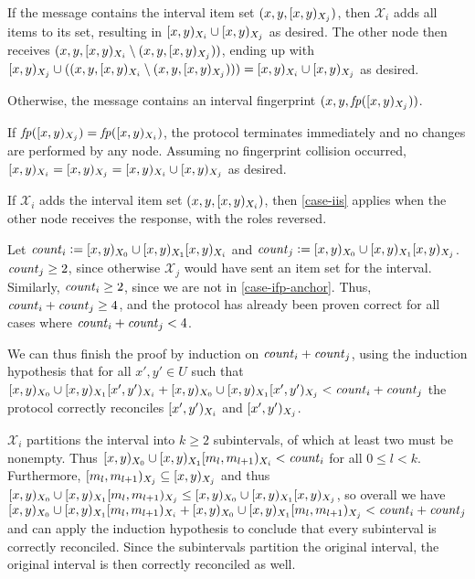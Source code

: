 \begin{caselist}
 \label{case-iis}  If the message contains the interval item set $({x}, {y}, [{x},{y})_{X_j})$, then $\mathcal{X}_i$ adds all items to its set, resulting in $[{x},{y})_{X_i} \cup [{x},{y})_{X_j}$ as desired. The other node then receives $({x}, {y}, {[{x},{y})_{X_i} \setminus ({x}, {y}, [{x},{y})_{X_j})})$, ending up with $[{x},{y})_{X_j} \cup (({x}, {y}, {[{x},{y})_{X_i} \setminus ({x}, {y}, [{x},{y})_{X_j})})) = [{x},{y})_{X_i} \cup [{x},{y})_{X_j}$ as desired.

 \label{case-ifp} Otherwise, the message contains an interval fingerprint $({x}, {y}, {\mathit{fp}([{x},{y})_{X_j})})$.

\begin{caselist}
 If $\mathit{fp}([{x},{y})_{X_j}) = \mathit{fp}([{x},{y})_{X_i})$, the protocol terminates immediately and no changes are performed by any node. Assuming no fingerprint collision occurred, $[{x},{y})_{X_i} = [{x},{y})_{X_j} = [{x},{y})_{X_i} \cup [{x},{y})_{X_j}$ as desired.

 \label{case-ifp-anchor} If $\mathcal{X}_i$ adds the interval item set $({x}, {y}, [{x},{y})_{X_i})$, then \cref{case-iis} applies when the other node receives the response, with the roles reversed.

\case[Recurse] Let $\mathit{count}_{i} \vcentcolon= [{x},{y})_{X_0} \cup [{x},{y})_{X_1}{[{x},{y})_{X_i}}$ and $\mathit{count}_{j} \vcentcolon= [{x},{y})_{X_0} \cup [{x},{y})_{X_1}{[{x},{y})_{X_j}}$. $\mathit{count}_{j} \geq 2$, since otherwise $\mathcal{X}_j$ would have sent an item set for the interval. Similarly, $\mathit{count}_{i} \geq 2$, since we are not in \cref{case-ifp-anchor}. Thus, $\mathit{count}_{i} + \mathit{count}_{j} \geq 4$, and the protocol has already been proven correct for all cases where $\mathit{count}_{i} + \mathit{count}_{j} < 4$. 

We can thus finish the proof by induction on $\mathit{count}_{i} + \mathit{count}_{j}$, using the induction hypothesis that for all $x', y' \in U$ such that $[{x},{y})_{X_0} \cup [{x},{y})_{X_1}{[{x'},{y'})_{X_i}} + [{x},{y})_{X_0} \cup [{x},{y})_{X_1}{[{x'},{y'})_{X_j}} < \mathit{count}_{i} + \mathit{count}_{j}$ the protocol correctly reconciles $[{x'},{y'})_{X_i}$ and $[{x'},{y'})_{X_j}$.

$\mathcal{X}_i$ partitions the interval into $k \geq 2$ subintervals, of which at least two must be nonempty.
Thus $[{x},{y})_{X_0} \cup [{x},{y})_{X_1}{[{m_l},{m_{l + 1}})_{X_i}} < \mathit{count}_{i}$ for all $0 \leq l < k$.
Furthermore, $[{m_l},{m_{l + 1}})_{X_j} \subseteq [{x},{y})_{X_j}$ and thus $[{x},{y})_{X_0} \cup [{x},{y})_{X_1}{[{m_l},{m_{l + 1}})_{X_j}} \leq [{x},{y})_{X_0} \cup [{x},{y})_{X_1}{[{x},{y})_{X_j}}$, so overall we have $[{x},{y})_{X_0} \cup [{x},{y})_{X_1}{[{m_l},{m_{l + 1}})_{X_i}} + [{x},{y})_{X_0} \cup [{x},{y})_{X_1}{[{m_l},{m_{l + 1}})_{X_j}} < \mathit{count}_{i} + \mathit{count}_{j}$ and can apply the induction hypothesis to conclude that every subinterval is correctly reconciled. Since the subintervals partition the original interval, the original interval is then correctly reconciled as well.
\end{caselist}
\end{caselist}

